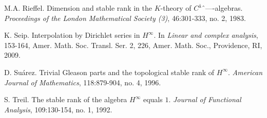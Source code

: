 \documentclass[11pt,reqno]{amsart}
\numberwithin{equation}{section}
\theoremstyle{definition}
\theoremstyle{definition}
\theoremstyle{definition}
\begin{document}
\begin{thebibliography}{10}
M.A. Rieffel. 
Dimension and stable rank in the $K$-theory of $C^â$-algebras. 
{\em Proceedings of the London Mathematical Society (3)}, 46:301-333, 
no. 2, 1983.

K. Seip. 
Interpolation by Dirichlet series in $H^\infty$. In 
{\em Linear and complex analysis}, 153-164,
Amer. Math. Soc. Transl. Ser. 2, 226, 
Amer. Math. Soc., Providence, RI, 2009. 

D. Su{\'a}rez. 
Trivial Gleason parts and the topological stable rank of $H^\infty$. 
{\em American Journal of Mathematics}, 118:879-904, no. 4, 1996. 

S. Treil. 
The stable rank of the algebra $H^\infty$ equals $1$. 
{\em Journal of Functional Analysis}, 109:130-154, no. 1, 1992. 

\end{thebibliography}
\end{document}
